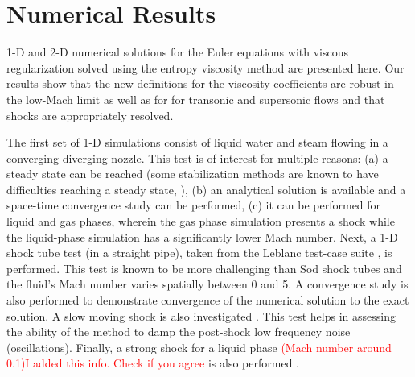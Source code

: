 \documentclass[preprint,10pt]{elsarticle}
\newcommand{\tcr}[1]{\textcolor{red}{#1}}
\begin{document}
\section{Numerical Results} \label{sec:results}

1-D and 2-D numerical solutions for the Euler equations with viscous regularization solved using the entropy 
viscosity method are presented here.
Our results show that the new definitions for the viscosity coefficients are robust in the low-Mach limit as well as for
for transonic and supersonic flows and that shocks are appropriately resolved. 

The first set of 1-D simulations consist of liquid water and steam flowing in a converging-diverging nozzle. 
This test is of interest for multiple reasons: (a) a steady state can be reached (some stabilization methods 
are known to have difficulties reaching a steady state, \cite{FluxLimiter, FluxLimiter2}), (b) 
an analytical solution is available and a space-time convergence study can be performed, (c) it 
can be performed for liquid and gas phases, wherein the gas phase simulation presents a shock while 
the liquid-phase simulation has a significantly lower Mach number.
%
Next, a 1-D shock tube test (in a straight pipe), taken from the Leblanc test-case suite \cite{Leblanc}, 
is performed. This test is known to be more challenging than Sod shock tubes and the fluid's Mach 
number varies spatially between 0 and 5. A convergence study is also performed to demonstrate 
convergence of the numerical solution to the exact solution. 
%
A slow moving shock is also investigated \cite{james}. This test helps in assessing the ability of 
the method to damp the post-shock low frequency noise (oscillations). 
%
Finally, a strong shock for a liquid phase \tcr{(Mach number around 0.1)}\tcr{I added this info. Check if you agree} is also performed \cite{abgrall}.
\end{document}
